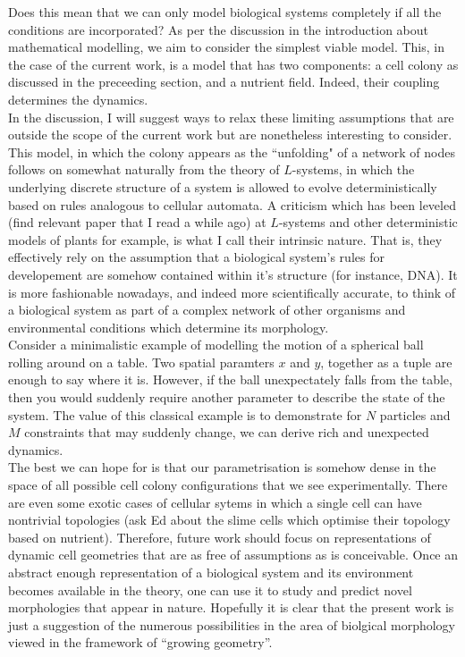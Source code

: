 Does this mean that we can only model biological systems completely if all the conditions 
are incorporated? As per the discussion in the introduction about mathematical modelling,
we aim to consider the simplest viable model. This, in the case of the current work, 
is a model that has two components: a cell colony as discussed in the preceeding section, and 
a nutrient field. Indeed, their coupling determines the dynamics. 
\\

In the discussion, I will suggest ways to relax these limiting assumptions that
are outside the scope of the current work but are nonetheless interesting to consider.
\\

This model, in which the colony appears as the ``unfolding" of a network of nodes
follows on somewhat naturally from the theory of $L$-systems, in which the underlying 
discrete structure of a system is allowed to evolve deterministically based on rules
analogous to cellular automata. A criticism which has been leveled 
(find relevant paper that I read a while ago) at $L$-systems and other deterministic models
of plants for example, is what I call their intrinsic nature. That is, they effectively
rely on the assumption that a biological system's rules for developement are somehow contained
within it's structure (for instance, DNA). It is more fashionable nowadays, and indeed more 
scientifically accurate, to think of a biological system as part of a complex network 
of other organisms and environmental conditions which determine its morphology.
\\

Consider a minimalistic example of modelling the motion of a spherical ball rolling around on a table.
Two spatial paramters $x$ and $y$, together as a tuple are enough to say where it is. However, 
if the ball unexpectately falls from the table, then you would suddenly require
another parameter to describe the state of the system. The value of this classical example
is to demonstrate for $N$ particles and $M$ constraints that may suddenly change, 
we can derive rich and unexpected dynamics.
\\

The best we can hope for is that our parametrisation is somehow dense in the space
of all possible cell colony configurations that we see experimentally. There are even
some exotic cases of cellular sytems in which a single cell can have nontrivial topologies (ask Ed 
about the slime cells which optimise their topology based on nutrient). Therefore, future work 
should focus on representations of dynamic cell geometries that are as free of assumptions as
is conceivable. Once an abstract enough representation of a biological system and its environment
becomes available in the theory, one can use it to study and predict novel morphologies that appear 
in nature. Hopefully it is clear that the present work is just a suggestion of the numerous possibilities
in the area of biolgical morphology viewed in the framework of ``growing geometry''.

